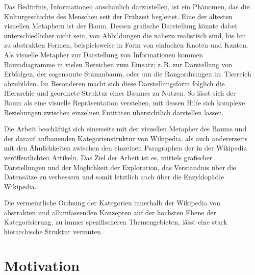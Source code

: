 
Das Bedürfnis, Informationen anschaulich darzustellen, ist ein Phänomen, das die Kulturgeschichte des Menschen seit der Frühzeit begleitet. Eine der ältesten visuellen Metaphern ist der Baum.
Dessen grafische Darstellung könnte dabei unterschiedlicher nicht sein, von Abbildungen die nahezu realistisch sind, bis hin zu abstrakten Formen, beispielsweise in Form von einfachen Knoten und Kanten.
Als visuelle Metapher zur Darstellung von Informationen kommen Baumdiagramme in vielen Bereichen zum Einsatz; z.\,B. zur Darstellung von Erbfolgen, der sogenannte Stammbaum, oder um die Rangordnungen im Tierreich abzubilden.
Im Besonderen macht sich diese Darstellungsform folglich die Hierarchie und geordnete Struktur eines Baumes zu Nutzen.
So lässt sich der Baum als eine visuelle Repräsentation verstehen, mit dessen Hilfe sich komplexe Beziehungen zwischen einzelnen Entitäten übersichtlich darstellen lassen.\cite{lima2014book}

Die Arbeit beschäftigt sich einerseits mit der visuellen Metapher des Baums und der darauf aufbauenden Kategorienstruktur von Wikipedia, als auch andererseits mit den Ähnlichkeiten zwischen den einzelnen Paragraphen der in der Wikipedia veröffentlichten Artikeln.
Das Ziel der Arbeit ist es, mittels grafischer Darstellungen und der Möglichkeit der Exploration, das Verständnis über die Datensätze zu verbessern und somit letztlich auch über die Enzyklopädie Wikipedia.

%

Die vermeintliche Ordnung der Kategorien innerhalb der Wikipedia von abstrakten und allumfassenden Konzepten auf der höchsten Ebene der Kategorisierung, zu immer spezifischeren Themengebieten, lässt eine stark hierarchische Struktur vermuten.

\section{Motivation}

